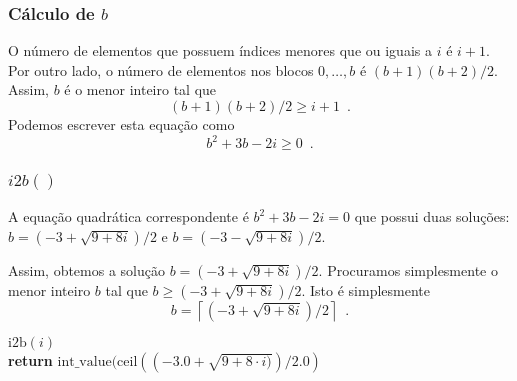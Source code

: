 \documentclass{beamer}
\begin{document}
\begin{frame}
\frametitle{Cálculo de $b$}
O número de elementos que possuem índices menores que ou iguais a \ensuremath{\ensuremath{\ensuremath{\mathit{i}}}} é $\ensuremath{\ensuremath{\ensuremath{\mathit{i}}}}+1$.  Por outro lado, o número de elementos
nos blocos $0,\ldots,b$ é $(\ensuremath{\ensuremath{\ensuremath{\mathit{b}}}}+1)(\ensuremath{\ensuremath{\ensuremath{\mathit{b}}}}+2)/2$.  Assim, \ensuremath{\ensuremath{\ensuremath{\mathit{b}}}} é o menor inteiro tal que
\[
    (\ensuremath{\ensuremath{\ensuremath{\mathit{b}}}}+1)(\ensuremath{\ensuremath{\ensuremath{\mathit{b}}}}+2)/2 \ge \ensuremath{\ensuremath{\ensuremath{\mathit{i}}}}+1 \enspace .
\]
Podemos escrever esta equação como
\[
    \ensuremath{\ensuremath{\ensuremath{\mathit{b}}}}^2 + 3\ensuremath{\ensuremath{\ensuremath{\mathit{b}}}} - 2\ensuremath{\ensuremath{\ensuremath{\mathit{i}}}} \ge  0 \enspace .
\]
\end{frame}
\begin{frame}
\frametitle{$i2b()$}
A equação quadrática correspondente é $\ensuremath{\ensuremath{\ensuremath{\mathit{b}}}}^2 + 3\ensuremath{\ensuremath{\ensuremath{\mathit{b}}}} - 2\ensuremath{\ensuremath{\ensuremath{\mathit{i}}}} =  0$ que possui duas soluções: $\ensuremath{\ensuremath{\ensuremath{\mathit{b}}}}=(-3 + \sqrt{9+8\ensuremath{\ensuremath{\ensuremath{\mathit{i}}}}}) / 2$ e $\ensuremath{\ensuremath{\ensuremath{\mathit{b}}}}=(-3 - \sqrt{9+8\ensuremath{\ensuremath{\ensuremath{\mathit{i}}}}}) / 2$.

Assim, obtemos a solução $\ensuremath{\ensuremath{\ensuremath{\mathit{b}}}} = (-3 +
\sqrt{9+8i}) / 2$.  Procuramos simplesmente o menor inteiro  $\ensuremath{\ensuremath{\ensuremath{\mathit{b}}}}$ tal que 
$\ensuremath{\ensuremath{\ensuremath{\mathit{b}}}} \ge (-3 + \sqrt{9+8i}) / 2$.  Isto é simplesmente
\[
   \ensuremath{\ensuremath{\ensuremath{\mathit{b}}}} = \left\lceil(-3 + \sqrt{9+8i}) / 2\right\rceil \enspace .
\]

\begin{oframed}
\begin{flushleft}
\hspace*{1em} \ensuremath{\mathrm{i2b}(\ensuremath{\mathit{i}})}\\
\hspace*{1em} \hspace*{1em} {\color{black} \textbf{return}} \ensuremath{\mathrm{int\_value}(\mathrm{ceil}((-3.0 + \sqrt{9 + 8\cdot \ensuremath{\mathit{i}})}) / \ensuremath{2.0})}\\
\end{flushleft}
\end{oframed}
\end{frame}
\end{document}
